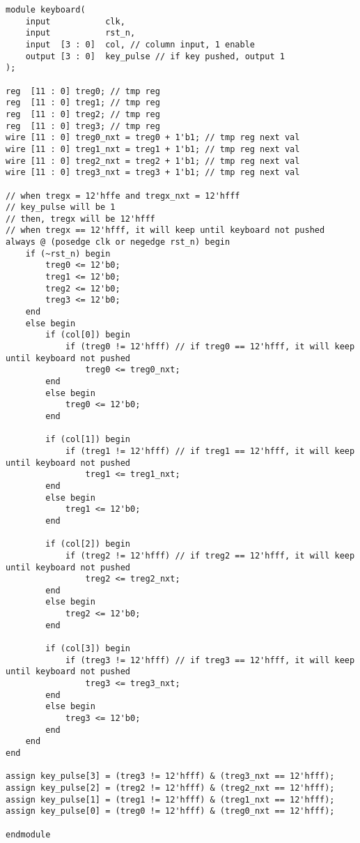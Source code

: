\lstset{language=verilog}
\begin{lstlisting}
module keyboard(
    input           clk,
    input           rst_n,
    input  [3 : 0]  col, // column input, 1 enable
    output [3 : 0]  key_pulse // if key pushed, output 1
);

reg  [11 : 0] treg0; // tmp reg
reg  [11 : 0] treg1; // tmp reg
reg  [11 : 0] treg2; // tmp reg
reg  [11 : 0] treg3; // tmp reg
wire [11 : 0] treg0_nxt = treg0 + 1'b1; // tmp reg next val
wire [11 : 0] treg1_nxt = treg1 + 1'b1; // tmp reg next val
wire [11 : 0] treg2_nxt = treg2 + 1'b1; // tmp reg next val
wire [11 : 0] treg3_nxt = treg3 + 1'b1; // tmp reg next val

// when tregx = 12'hffe and tregx_nxt = 12'hfff
// key_pulse will be 1
// then, tregx will be 12'hfff
// when tregx == 12'hfff, it will keep until keyboard not pushed
always @ (posedge clk or negedge rst_n) begin
    if (~rst_n) begin
        treg0 <= 12'b0;
        treg1 <= 12'b0;
        treg2 <= 12'b0;
        treg3 <= 12'b0;
    end
    else begin
        if (col[0]) begin 
            if (treg0 != 12'hfff) // if treg0 == 12'hfff, it will keep until keyboard not pushed
                treg0 <= treg0_nxt;
        end
        else begin
            treg0 <= 12'b0;
        end

        if (col[1]) begin
            if (treg1 != 12'hfff) // if treg1 == 12'hfff, it will keep until keyboard not pushed
                treg1 <= treg1_nxt;
        end
        else begin   
            treg1 <= 12'b0;
        end

        if (col[2]) begin
            if (treg2 != 12'hfff) // if treg2 == 12'hfff, it will keep until keyboard not pushed
                treg2 <= treg2_nxt;
        end
        else begin
            treg2 <= 12'b0;
        end

        if (col[3]) begin
            if (treg3 != 12'hfff) // if treg3 == 12'hfff, it will keep until keyboard not pushed
                treg3 <= treg3_nxt;
        end
        else begin        
            treg3 <= 12'b0;
        end
    end
end

assign key_pulse[3] = (treg3 != 12'hfff) & (treg3_nxt == 12'hfff); 
assign key_pulse[2] = (treg2 != 12'hfff) & (treg2_nxt == 12'hfff);
assign key_pulse[1] = (treg1 != 12'hfff) & (treg1_nxt == 12'hfff);
assign key_pulse[0] = (treg0 != 12'hfff) & (treg0_nxt == 12'hfff);

endmodule
\end{lstlisting}